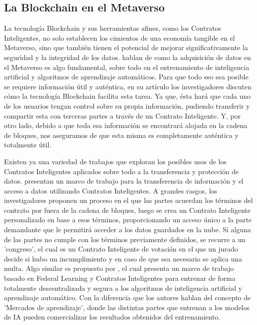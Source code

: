 \documentclass[a4paper,10pt]{article}
\begin{document}
	\subsection{La Blockchain en el Metaverso}
	La tecnología Blockchain y sus herramientas afines, como los Contratos Inteligentes, no solo establecen los cimientos de una economía tangible en el Metaverso, sino que también tienen el potencial de mejorar significativamente la seguridad y la integridad de los datos. \textcite{huynh2023blockchain} hablan de como la adquisición de datos en el Metaverso es algo fundamental, sobre todo en el entrenamiento de inteligencia artificial y algoritmos de aprendizaje automáticos. Para que todo eso sea posible se requiere información útil y auténtica, en su artículo los investigadores discuten cómo la tecnología Blockchain facilita esta tarea. Ya que, ésta hará que cada uno de los usuarios tengan control sobre su propia información, pudiendo transferir y compartir esta con terceras partes a través de un Contrato Inteligente. Y, por otro lado, debido a que toda esa información se encontrará alojada en la cadena de bloques, nos aseguramos de que esta misma es completamente auténtica y totalmente útil. 
	
	Existen ya una variedad de trabajos que exploran los posibles usos de los Contratos Inteligentes aplicados sobre todo a la transferencia y protección de datos. \textcite{liu2018enforceable} presentan un marco de trabajo para la transferencia de información y el acceso a datos utilizando Contratos Inteligentes. A grandes rasgos, los investigadores proponen un proceso en el que las partes acuerdan los términos del contrato por fuera de la cadena de bloques, luego se crea un Contrato Inteligente personalizado en base a esos términos, proporcionando un acceso único a la parte demandante que le permitirá acceder a los datos guardados en la nube. Si alguna de las partes no cumple con los términos previamente definidos, se recurre a un 'congreso', el cual es un Contrato Inteligente de votación en el que un jurado decide si hubo un incumplimiento y en caso de que sea necesario se aplica una multa.
	Algo similar es propuesto por \textcite{ouyang2020learning}, el cual presenta un marco de trabajo basado en Federal Learning y Contratos Inteligentes para entrenar de forma totalmente descentralizada y segura a los algoritmos de inteligencia artificial y aprendizaje automático. Con la diferencia que los autores hablan del concepto de 'Mercados de aprendizaje', donde las distintas partes que entrenan a los modelos de IA pueden comercializar los resultados obtenidos del entrenamiento.
	
\end{document}
